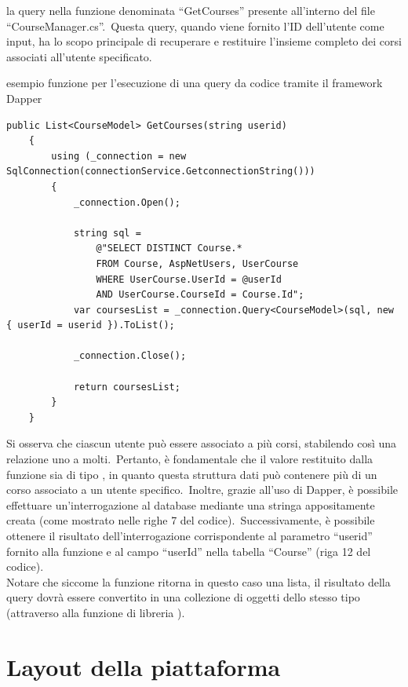 la query nella funzione denominata ``GetCourses'' presente all'interno del file ``CourseManager.cs''.\ Questa query, 
quando viene fornito l'ID dell'utente come input, ha lo scopo principale di recuperare e restituire 
l'insieme completo dei corsi associati all'utente specificato.
%
\begin{algorithm}[H]
	\caption{esempio funzione per l'esecuzione di una query da codice tramite il framework Dapper}
	\label{lst:genic_mpi}
	\begin{lstlisting}[label=lst:test]
	public List<CourseModel> GetCourses(string userid)
	{
		using (_connection = new SqlConnection(connectionService.GetconnectionString()))
		{
			_connection.Open();

			string sql = 
				@"SELECT DISTINCT Course.* 
				FROM Course, AspNetUsers, UserCourse 
				WHERE UserCourse.UserId = @userId     
				AND UserCourse.CourseId = Course.Id";
			var coursesList = _connection.Query<CourseModel>(sql, new { userId = userid }).ToList();

			_connection.Close();

			return coursesList;
		}
	} 
	\end{lstlisting}
\end{algorithm}
%
Si osserva che ciascun utente può essere associato a più corsi, 
stabilendo così una relazione uno a molti.\ Pertanto, è fondamentale 
che il valore restituito dalla funzione sia di tipo , 
in quanto questa struttura dati può contenere più di un corso associato a 
un utente specifico.\ Inoltre, grazie all'uso di Dapper, è possibile effettuare 
un'interrogazione al database mediante una stringa appositamente creata 
(come mostrato nelle righe 7 del codice).\ Successivamente, è possibile 
ottenere il risultato dell'interrogazione corrispondente al parametro ``userid'' 
fornito alla funzione e al campo ``userId'' nella tabella ``Course'' (riga 12 del codice).
\\
Notare che siccome la funzione ritorna in questo caso una lista, il risultato della query
dovrà essere convertito in una collezione di oggetti dello stesso tipo (attraverso alla funzione di libreria ).

\section{Layout della piattaforma}\label{sec:cap_sec_subsec}